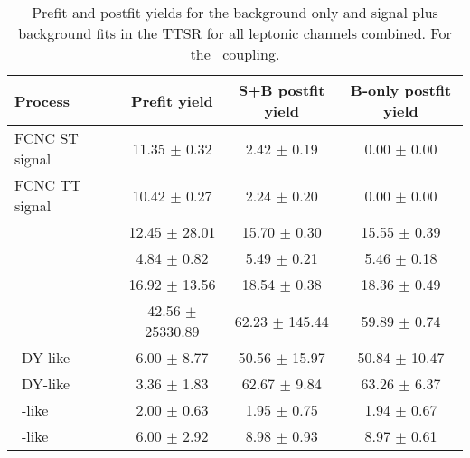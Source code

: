 \begin{table}[htbp]
	\centering
	\caption{Prefit and postfit yields for the background only and signal plus background fits in the TTSR for all leptonic channels combined. For the \kZut\ coupling.}
	\begin{tabular}{lccc}
		\toprule
		Process & Prefit yield & S+B postfit yield & B-only postfit yield \\
		\midrule
		FCNC ST signal \kZut\          &   11.35 $\pm$    0.32 &     2.42 $\pm$    0.19 &     0.00 $\pm$    0.00 \\
		FCNC TT signal \kZut\          &   10.42 $\pm$    0.27 &     2.24 $\pm$    0.20 &     0.00 $\pm$    0.00 \\
		\WZ\                           &   12.45 $\pm$   28.01 &    15.70 $\pm$    0.30 &    15.55 $\pm$    0.39 \\
		\ZZ\                           &    4.84 $\pm$    0.82 &     5.49 $\pm$    0.21 &     5.46 $\pm$    0.18 \\
		\tZq\                          &   16.92 $\pm$   13.56 &    18.54 $\pm$    0.38 &    18.36 $\pm$    0.49 \\
		\ttZ\                          &   42.56 $\pm$ 25330.89 &    62.23 $\pm$  145.44 &    59.89 $\pm$    0.74 \\
		\NPE\ DY-like                  &    6.00 $\pm$    8.77 &    50.56 $\pm$   15.97 &    50.84 $\pm$   10.47 \\
		\NPM\ DY-like                  &    3.36 $\pm$    1.83 &    62.67 $\pm$    9.84 &    63.26 $\pm$    6.37 \\
		\NPE\ \ttbar -like             &    2.00 $\pm$    0.63 &     1.95 $\pm$    0.75 &     1.94 $\pm$    0.67 \\
		\NPM\ \ttbar -like             &    6.00 $\pm$    2.92 &     8.98 $\pm$    0.93 &     8.97 $\pm$    0.61 \\
		\bottomrule
	\end{tabular}
	\label{tab:PrePostAllTTSR}
\end{table}

